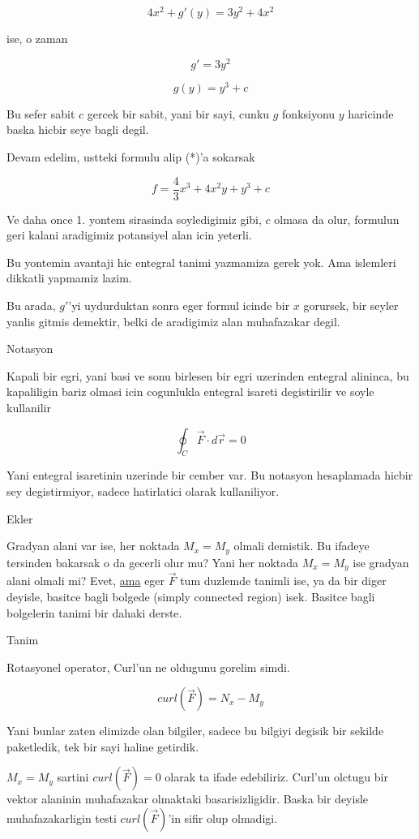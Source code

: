 \documentclass[12pt,fleqn]{article}
\begin{document}
\[ 4x^2 + g'(y) = 3y^2 + 4x^2 \]

ise, o zaman

\[ g' = 3y^2 \]

\[ g(y) = y^3 + c \]

Bu sefer sabit $c$ gercek bir sabit, yani bir sayi, cunku $g$ fonksiyonu
$y$ haricinde baska hicbir seye bagli degil. 

Devam edelim, ustteki formulu alip (*)'a sokarsak

\[ f = \frac{4}{3}x^3 + 4x^2y + y^3 + c\]

Ve daha once 1. yontem sirasinda soyledigimiz gibi, $c$ olmasa da olur,
formulun geri kalani aradigimiz potansiyel alan icin yeterli. 

Bu yontemin avantaji hic entegral tanimi yazmamiza gerek yok. Ama islemleri
dikkatli yapmamiz lazim. 

Bu arada, $g'$'yi uydurduktan sonra eger formul icinde bir $x$ gorursek,
bir seyler yanlis gitmis demektir, belki de aradigimiz alan muhafazakar
degil. 

Notasyon 

Kapali bir egri, yani basi ve sonu birlesen bir egri uzerinden entegral
alininca, bu kapaliligin bariz olmasi icin cogunlukla entegral isareti
degistirilir ve soyle kullanilir 

\[ \oint_{C} \vec{F} \cdot d\vec{r} = 0\]

Yani entegral isaretinin uzerinde bir cember var. Bu notasyon hesaplamada
hicbir sey degistirmiyor, sadece hatirlatici olarak kullaniliyor. 

Ekler

Gradyan alani var ise, her noktada $M_x = M_y$ olmali demistik. Bu ifadeye
tersinden bakarsak o da gecerli olur mu? Yani her noktada $M_x = M_y$ ise
gradyan alani olmali mi? Evet, \underline{ama} eger $\vec{F}$ tum duzlemde
tanimli ise, ya da bir diger deyisle, basitce bagli bolgede (simply
connected region) isek. Basitce bagli bolgelerin tanimi bir dahaki derste. 

Tanim

Rotasyonel operator, Curl'un ne oldugunu gorelim simdi. 

\[ curl(\vec{F}) = N_x - M_y \]

Yani bunlar zaten elimizde olan bilgiler, sadece bu bilgiyi degisik bir
sekilde paketledik, tek bir sayi haline getirdik. 

$M_x = M_y$ sartini $curl(\vec{F}) = 0$ olarak ta ifade edebiliriz. Curl'un
olctugu bir vektor alaninin muhafazakar olmaktaki basarisizligidir. Baska
bir deyisle muhafazakarligin testi $curl(\vec{F})$'in sifir olup olmadigi. 
\end{document}
